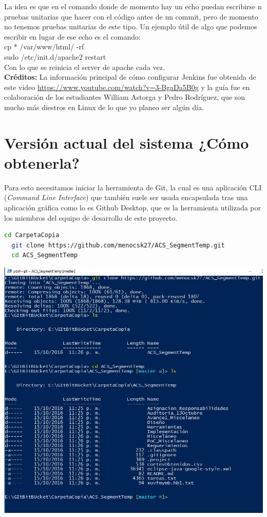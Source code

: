 \documentclass[a4paper]{article}
\newcommand\tab[1][0.55cm]{\hspace*{#1}}
\begin{document}
{   La idea es que en el comando donde de momento hay un echo puedan escribirse n pruebas unitarias que hacer con el código antes de un commit, pero de momento no tenemos pruebas unitarias de este tipo. Un ejemplo útil de algo que podemos escribir en lugar de ese echo es el comando: \\
\tab    cp * /var/www/html/ -rf\\
\tab    sudo /etc/init.d/apache2 restart\\
   Con lo que se reinicia el server de apache cada vez. \\
 
 	\textbf{Créditos:} La información principal de cómo configurar Jenkins fue obtenida de este video \url{https://www.youtube.com/watch?v=3-BgaDa5B0g} y la guía fue en colaboración de los estudiantes William Astorga y Pedro Rodríguez, que son mucho más diestros en Linux de lo que yo planeo ser algún día. 

\justify 
\newpage
\color{Blue}
\centering{ \rule{16cm}{0.1cm} } 
\justify 
\section{\textbf{Versión actual del sistema ¿Cómo obtenerla?}}}
\color{black}
\justify

\tab Para esto necesitamos iniciar la herramienta de Git, la cual es una aplicación CLI (\textit{Command Line Interface}) que también suele ser usada encapsulada tras una aplicación gráfica como lo es Github Desktop, que es la herramienta utilizada por los miembros del equipo de desarrollo de este proyecto. \\
    
    
\begin{lstlisting}[language=bash]
  cd CarpetaCopia
  git clone https://github.com/menocsk27/ACS_SegmentTemp.git
  cd ACS_SegmentTemp
\end{lstlisting}

\includegraphics[scale=0.5]{git_clone.jpg}
\end{document}

